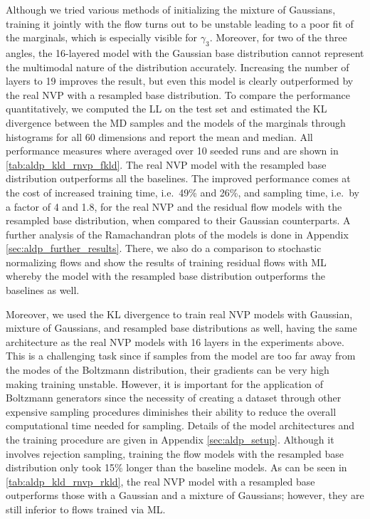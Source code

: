 \documentclass[twoside]{article}
\begin{document}
Although we tried various methods of initializing the mixture of Gaussians, training it jointly with the flow turns out to be unstable leading to a poor fit of the marginals, which is especially visible for $\gamma_3$. Moreover, for two of the three angles, the 16-layered model with the Gaussian base distribution cannot represent the multimodal nature of the distribution accurately. Increasing the number of layers to 19 improves the result, but even this model is clearly outperformed by the real NVP with a resampled base distribution. To compare the performance quantitatively, we computed the LL on the test set and estimated the KL divergence between the MD samples and the models of the marginals through histograms for all 60 dimensions and report the mean and median. All performance measures where averaged over 10 seeded runs and are shown in \autoref{tab:aldp_kld_rnvp_fkld}. The real NVP model with the resampled base distribution outperforms all the baselines. The improved performance comes at the cost of increased training time, i.e.\ 49\% and 26\%, and sampling time, i.e.\ by a factor of 4 and 1.8, for the real NVP and the residual flow models with the resampled base distribution, when compared to their Gaussian counterparts. A further analysis of the Ramachandran plots of the models is done in Appendix \ref{sec:aldp_further_results}. There, we also do a comparison to stochastic normalizing flows \citep{Wu2020} and show the results of training residual flows with ML whereby the model with the resampled base distribution outperforms the baselines as well.

Moreover, we used the KL divergence to train real NVP models with Gaussian, mixture of Gaussians, and resampled base distributions as well, having the same architecture as the real NVP models with 16 layers in the experiments above. This is a challenging task since if samples from the model are too far away from the modes of the Boltzmann distribution, their gradients can be very high making training unstable. However, it is important for the application of Boltzmann generators since the necessity of creating a dataset through other expensive sampling procedures diminishes their ability to reduce the overall computational time needed for sampling. Details of the model architectures and the training procedure are given in Appendix \ref{sec:aldp_setup}. Although it involves rejection sampling, training the flow models with the resampled base distribution only took 15\% longer than the baseline models. As can be seen in \autoref{tab:aldp_kld_rnvp_rkld}, the real NVP model with a resampled base outperforms those with a Gaussian and a mixture of Gaussians; however, they are still inferior to flows trained via ML.
\end{document}
